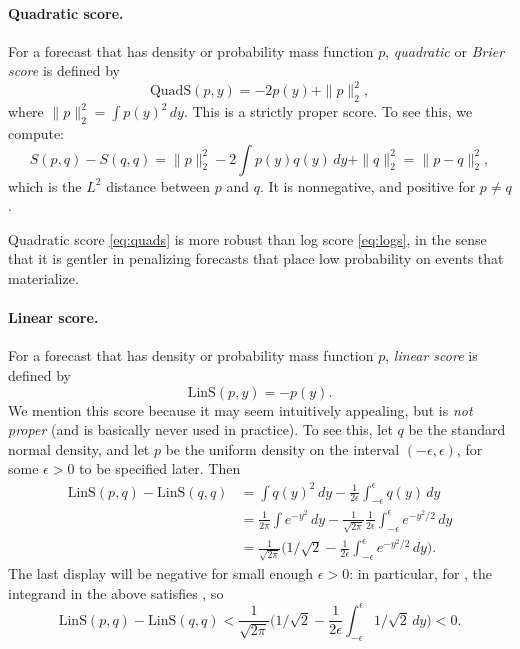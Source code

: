 \documentclass{article}
\begin{document}
\paragraph{Quadratic score.}

For a forecast that has density or probability mass function $p$,
\emph{quadratic} or \emph{Brier score} is defined by   
\begin{equation}
\label{eq:quads}
\mathrm{QuadS}(p, y) = -2p(y) + \|p\|_2^2,
\end{equation}
where $\|p\|_2^2 = \int p(y)^2 \, dy$. This is a strictly proper score. To see
this, we compute:  
\[
S(p, q) - S(q, q) = \|p\|_2^2 - 2 \int p(y) q(y) \, dy + \|q\|_2^2 =
\|p-q\|_2^2,
\]
which is the $L^2$ distance between $p$ and $q$. It is nonnegative, and
positive for $p \not= q$.  

Quadratic score \eqref{eq:quads} is more robust than log score \eqref{eq:logs},
in the sense that it is gentler in penalizing forecasts that place low
probability on events that materialize.  

\paragraph{Linear score.}

For a forecast that has density or probability mass function $p$,
\emph{linear score} is defined by   
\[
\mathrm{LinS}(p, y) = -p(y).
\]
We mention this score because it may seem intuitively appealing, but is
\emph{not proper} (and is basically never used in practice). To see this, let
$q$ be the standard normal density, and let $p$ be the uniform density on the 
interval $(-\epsilon, \epsilon)$, for some $\epsilon>0$ to be specified
later. Then    
\begin{align*}
\mathrm{LinS}(p, q) - \mathrm{LinS}(q, q) 
&= \int q(y)^2 \, dy - \frac{1}{2\epsilon} 
  \int_{-\epsilon}^\epsilon q(y) \, dy \\
&= \frac{1}{2\pi} \int e^{-y^2} \, dy -  \frac{1}{\sqrt{2\pi}}
  \frac{1}{2\epsilon} \int_{-\epsilon}^\epsilon e^{-y^2/2} \, dy \\   
&= \frac{1}{\sqrt{2\pi}} \bigg( 1/\sqrt{2} - \frac{1}{2\epsilon}
\int_{-\epsilon}^\epsilon e^{-y^2/2} \, dy \bigg).
\end{align*}
The last display will be negative for small enough $\epsilon > 0$: in 
particular, for , the integrand in the above
satisfies , so 
\[
\mathrm{LinS}(p, q) - \mathrm{LinS}(q, q) < 
 \frac{1}{\sqrt{2\pi}} \bigg( 1/\sqrt{2} - \frac{1}{2\epsilon} 
\int_{-\epsilon}^\epsilon 1/\sqrt{2} \, dy \bigg) < 0.
\]
\end{document}
